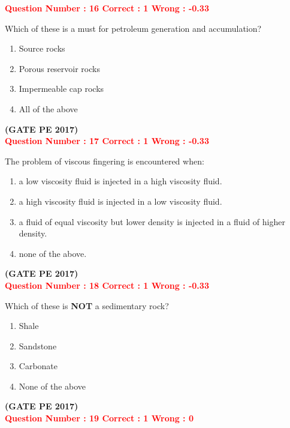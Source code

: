 \documentclass[journal,12pt,onecolumn]{article}
\begin{document}
{\textcolor{red}{\textbf{Question Number : 16 \hfill Correct : 1  Wrong : -0.33}}

Which of these is a must for petroleum generation and accumulation?

\begin{enumerate}[label=(\Alph*)]
    \item Source rocks
    \item Porous reservoir rocks
    \item Impermeable cap rocks
    \item All of the above
\end{enumerate}

\hfill\textbf{(GATE PE 2017)}\\[0.6cm]

\textcolor{red}{\textbf{Question Number : 17 \hfill Correct : 1  Wrong : -0.33}}

The problem of viscous fingering is encountered when:

\begin{enumerate}[label=(\Alph*)]
    \item a low viscosity fluid is injected in a high viscosity fluid.
    \item a high viscosity fluid is injected in a low viscosity fluid.
    \item a fluid of equal viscosity but lower density is injected in a fluid of higher density.
    \item none of the above.
\end{enumerate}

\hfill\textbf{(GATE PE 2017)}\\[0.6cm]

\textcolor{red}{\textbf{Question Number : 18 \hfill Correct : 1  Wrong : -0.33}}

Which of these is \textbf{NOT} a sedimentary rock?

\begin{enumerate}[label=(\Alph*)]
    \item Shale
    \item Sandstone
    \item Carbonate
    \item None of the above
\end{enumerate}

\hfill\textbf{(GATE PE 2017)}\\[0.6cm]


\textcolor{red}{\textbf{Question Number : 19 \hfill Correct : 1  Wrong : 0}}

}
\end{document}
